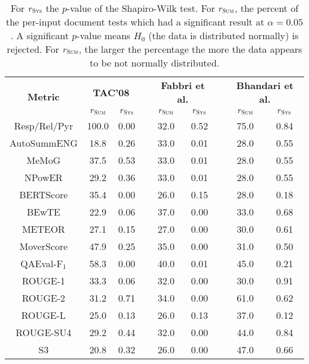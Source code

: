 \begin{table}
    \centering
    \begin{adjustbox}{width=\columnwidth}
    \begin{tabular}{ccccccccc}
        \toprule
        \multirow{2}{*}{\textbf{Metric}} & \multicolumn{2}{c}{\textbf{TAC'08}} & & \multicolumn{2}{c}{\textbf{Fabbri et al.}} & & \multicolumn{2}{c}{\textbf{Bhandari et al.}} \\
        \cmidrule{2-3} \cmidrule{5-6} \cmidrule{8-9}
        & $r_\textsc{Sum}$ & $r_\textsc{Sys}$ & & $r_\textsc{Sum}$ & $r_\textsc{Sys}$ & & $r_\textsc{Sum}$ & $r_\textsc{Sys}$ \\
        \midrule
Resp/Rel/Pyr & 100.0 & 0.00 &   & 32.0 & 0.52 &   & 75.0 & 0.84\\
AutoSummENG & 18.8 & 0.26 &   & 33.0 & 0.01 &   & 28.0 & 0.55\\
MeMoG & 37.5 & 0.53 &   & 33.0 & 0.01 &   & 28.0 & 0.55\\
NPowER & 29.2 & 0.36 &   & 33.0 & 0.01 &   & 28.0 & 0.55\\
BERTScore & 35.4 & 0.00 &   & 26.0 & 0.15 &   & 28.0 & 0.18\\
BEwTE & 22.9 & 0.06 &   & 37.0 & 0.00 &   & 33.0 & 0.68\\
METEOR & 27.1 & 0.15 &   & 27.0 & 0.00 &   & 30.0 & 0.61\\
MoverScore & 47.9 & 0.25 &   & 35.0 & 0.00 &   & 31.0 & 0.50\\
QAEval-F$_1$ & 58.3 & 0.00 &   & 40.0 & 0.01 &   & 45.0 & 0.21\\
ROUGE-1 & 33.3 & 0.06 &   & 32.0 & 0.00 &   & 30.0 & 0.91\\
ROUGE-2 & 31.2 & 0.71 &   & 34.0 & 0.00 &   & 61.0 & 0.62\\
ROUGE-L & 25.0 & 0.13 &   & 26.0 & 0.13 &   & 37.0 & 0.12\\
ROUGE-SU4 & 29.2 & 0.44 &   & 32.0 & 0.00 &   & 44.0 & 0.84\\
S3 & 20.8 & 0.32 &   & 26.0 & 0.00 &   & 47.0 & 0.66\\
  \bottomrule
    \end{tabular}
    \end{adjustbox} 
    \caption{For $r_\textsc{Sys}$ the $p$-value of the Shapiro-Wilk test.
    For $r_\textsc{Sum}$, the percent of the per-input document tests which had a significant result at $\alpha = 0.05$.
    A significant $p$-value means $H_0$ (the data is distributed normally) is rejected.
    For $r_\textsc{Sum}$, the larger the percentage the more the data appears to be not normally distributed.}
    \label{tab:normality}
\end{table}